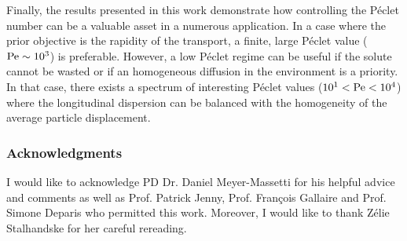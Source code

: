 Finally, the results presented in this work demonstrate how controlling the Péclet number can be a valuable asset in a numerous application. 
In a case where the prior objective is the rapidity of the transport, a finite, large Péclet value ($\mathrm{Pe}\sim10^3$) is preferable. 
However, a low Péclet regime can be useful if the solute cannot be wasted or if an homogeneous diffusion in the environment is a priority.
In that case, there exists a spectrum of interesting Péclet values ($10^1<\mathrm{Pe}<10^4$) where the longitudinal dispersion can be balanced with the homogeneity of the average particle displacement.
\subsubsection{Acknowledgments}
I would like to acknowledge PD Dr. Daniel Meyer-Massetti for his helpful advice and comments as well as Prof. Patrick Jenny, Prof. François Gallaire and Prof. Simone Deparis who permitted this work.
Moreover, I would like to thank Zélie Stalhandske for her careful rereading.

